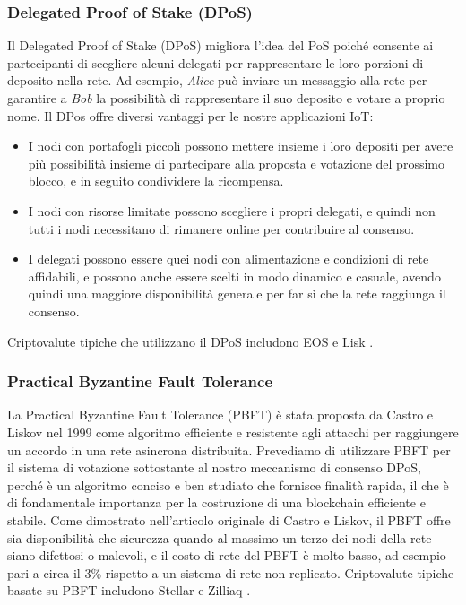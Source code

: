 \subsubsection{Delegated Proof of Stake (DPoS)}
Il Delegated Proof of Stake (DPoS) migliora l'idea del PoS poiché consente ai partecipanti di scegliere alcuni delegati per rappresentare le loro porzioni di deposito nella rete. Ad esempio, \emph{Alice} può inviare un messaggio alla rete per garantire a \emph{Bob} la possibilità di rappresentare il suo deposito e votare a proprio nome. Il DPos offre diversi vantaggi per le nostre applicazioni IoT:

\begin{itemize}
	\item I nodi con portafogli piccoli possono mettere insieme i loro depositi per avere più possibilità insieme di partecipare alla proposta e votazione del prossimo blocco, e in seguito condividere la ricompensa.

	\item I nodi con risorse limitate possono scegliere i propri delegati, e quindi non tutti i nodi necessitano di rimanere online per contribuire al consenso.

	\item I delegati possono essere quei nodi con alimentazione e condizioni di rete affidabili, e possono anche essere scelti in modo dinamico e casuale, avendo quindi una maggiore disponibilità generale per far sì che la rete raggiunga il consenso.
\end{itemize}

Criptovalute tipiche che utilizzano il DPoS includono EOS \cite{c9} e Lisk \cite{c18}.

\subsubsection{Practical Byzantine Fault Tolerance}
La Practical Byzantine Fault Tolerance (PBFT) è stata proposta da Castro e Liskov \cite{c7} nel 1999 come algoritmo efficiente e resistente agli attacchi per raggiungere un accordo in una rete asincrona distribuita. Prevediamo di utilizzare PBFT per il sistema di votazione sottostante al nostro meccanismo di consenso DPoS, perché è un algoritmo conciso e ben studiato che fornisce finalità rapida, il che è di fondamentale importanza per la costruzione di una
blockchain efficiente e stabile. Come dimostrato nell'articolo originale di Castro e Liskov, il PBFT offre sia disponibilità che sicurezza quando al massimo un terzo dei nodi della rete siano difettosi o malevoli, e il costo di rete del PBFT è molto basso, ad esempio pari a circa il 3\% rispetto a un sistema di rete non replicato. Criptovalute tipiche basate su PBFT includono Stellar \cite{c30} e Zilliaq \cite{c38}.

